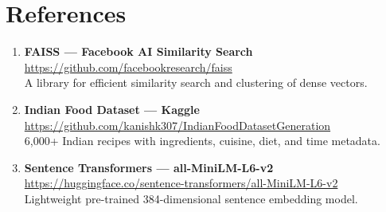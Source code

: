 \documentclass[12pt,a4paper]{article}
\begin{document}
\section{References}

\begin{enumerate}
  \item \textbf{FAISS — Facebook AI Similarity Search}\\
        \url{https://github.com/facebookresearch/faiss}\\
        A library for efficient similarity search and clustering of dense vectors.
  
  \item \textbf{Indian Food Dataset — Kaggle}\\
        \url{https://github.com/kanishk307/IndianFoodDatasetGeneration}\\
        6,000+ Indian recipes with ingredients, cuisine, diet, and time metadata.

  \item \textbf{Sentence Transformers — all-MiniLM-L6-v2}\\
        \url{https://huggingface.co/sentence-transformers/all-MiniLM-L6-v2}\\
        Lightweight pre-trained 384-dimensional sentence embedding model.
\end{enumerate}
\end{document}
